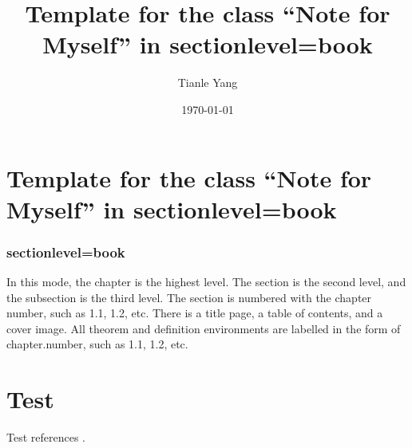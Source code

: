 \documentclass[sectionlevel=book]{noteformyself}
\title{Template for the class ``Note for Myself'' in sectionlevel=book}
\author{Tianle Yang}
\date{\today}
\begin{document}
    \maketitle

    \tableofcontents %

    \chapter{Template for the class ``Note for Myself'' in sectionlevel=book}


        \subsection{sectionlevel=book}


        In this mode, the chapter is the highest level.
        The section is the second level, and the subsection is the third level.
        The section is numbered with the chapter number, such as 1.1, 1.2, etc.
        There is a title page, a table of contents, and a cover image.
        All theorem and definition environments are labelled in the form of chapter.number, such as 1.1, 1.2, etc.

    \chapter{Test}

        Test references \cite{Har77}.


    \printbibliography[heading=bibintoc, title={References}] %
\end{document}
